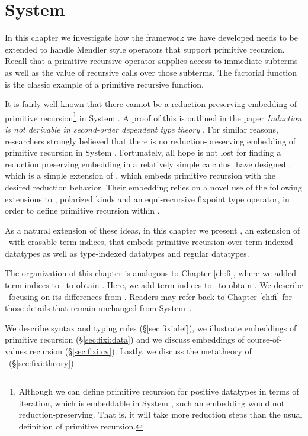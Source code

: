 \chapter{System \Fixi}\label{ch:fixi}

In this chapter we investigate how the framework we have developed
needs to be extended to handle Mendler style operators that support
primitive recursion. Recall that a primitive recursive operator supplies
access to immediate subterms as well as the value of recursive calls over
those subterms. The factorial function is the classic example of
a primitive recursive function.

It is fairly well known that there cannot be a reduction-preserving embedding
of primitive recursion\footnote{
	Although we can define primitive recursion for positive datatypes
	in terms of iteration, which is embeddable in System \F, such an
	embedding would not reduction-preserving. That is, it will take
	more reduction steps than the usual definition of primitive recursion.}
in System \F. A proof of this is outlined in the paper 
{\it Induction is not derivable in second-order dependent type theory}
\cite{Geuvers01}. For similar reasons, researchers strongly believed that
there is no reduction-preserving embedding of primitive recursion 
in System \Fw. Fortunately, all hope is not lost for finding
a reduction preserving embedding in a relatively simple calculus. 
\citet{AbeMat04} have designed \Fixw, which is a simple extension of \Fw,
which embeds primitive recursion with the desired reduction behavior.
Their embedding relies on a novel use of the following extensions to \Fw,
polarized kinds and an equi-recursive fixpoint type operator,
in order to define primitive recursion within \Fixw.

As a natural extension of these ideas, in this chapter we present \Fixi,
an extension of \Fixw\ with erasable term-indices, that embeds
primitive recursion over term-indexed datatypes as well as
type-indexed datatypes and regular datatypes.

The organization of this chapter is analogous to Chapter \ref{ch:fi},
where we added term-indices to \Fw\ to obtain \Fi. Here, we add
term indices to \Fixw\ to obtain \Fixi. We describe \Fixi\ focusing on
its differences from \Fi. Readers may refer back to Chapter \ref{ch:fi}
for those details that remain unchanged from System~\Fi.

We describe syntax and typing rules (\S\ref{sec:fixi:def}),
we illustrate embeddings of primitive recursion (\S\ref{sec:fixi:data})
and we discuss embeddings of course-of-values recursion (\S\ref{sec:fixi:cv}).
Lastly, we discuss the metatheory of \Fixi\ (\S\ref{sec:fixi:theory}).





